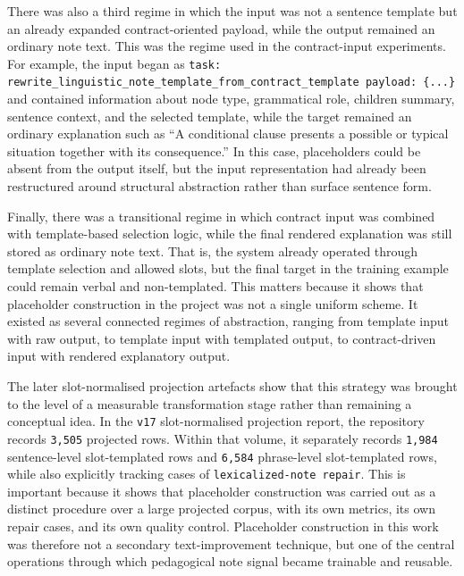 \documentclass[12pt,a4paper,oneside]{report}
\begin{document}
There was also a third regime in which the input was not a sentence template but an already expanded contract-oriented payload, while the output remained an ordinary note text. This was the regime used in the contract-input experiments. For example, the input began as \texttt{task: rewrite\_linguistic\_note\_template\_from\_contract\_template payload: \{...\}} and contained information about node type, grammatical role, children summary, sentence context, and the selected template, while the target remained an ordinary explanation such as ``A conditional clause presents a possible or typical situation together with its consequence.'' In this case, placeholders could be absent from the output itself, but the input representation had already been restructured around structural abstraction rather than surface sentence form.

Finally, there was a transitional regime in which contract input was combined with template-based selection logic, while the final rendered explanation was still stored as ordinary note text. That is, the system already operated through template selection and allowed slots, but the final target in the training example could remain verbal and non-templated. This matters because it shows that placeholder construction in the project was not a single uniform scheme. It existed as several connected regimes of abstraction, ranging from template input with raw output, to template input with templated output, to contract-driven input with rendered explanatory output.

The later slot-normalised projection artefacts show that this strategy was brought to the level of a measurable transformation stage rather than remaining a conceptual idea. In the \texttt{v17} slot-normalised projection report, the repository records \texttt{3,505} projected rows. Within that volume, it separately records \texttt{1,984} sentence-level slot-templated rows and \texttt{6,584} phrase-level slot-templated rows, while also explicitly tracking cases of \texttt{lexicalized-note repair}. This is important because it shows that placeholder construction was carried out as a distinct procedure over a large projected corpus, with its own metrics, its own repair cases, and its own quality control. Placeholder construction in this work was therefore not a secondary text-improvement technique, but one of the central operations through which pedagogical note signal became trainable and reusable.
\end{document}
